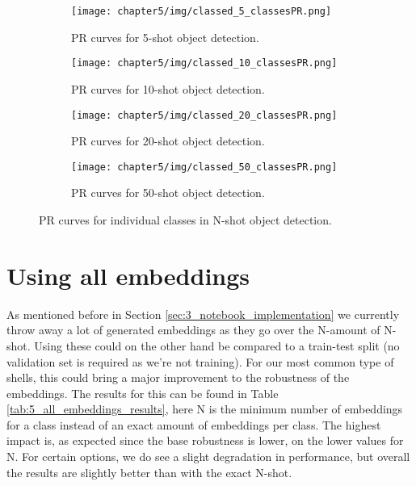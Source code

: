 \begin{figure}[H]
    \centering
    \begin{adjustwidth}{-0.5in}{-0.5in}
        \begin{subfigure}[b]{0.4\pdfpagewidth}
            \texttt{[image: chapter5/img/classed\_5\_classesPR.png]}
            \caption{PR curves for 5-shot object detection.}
            \label{fig:5_5_shot_classed_classes_PR}
        \end{subfigure}
        \hfill
        \begin{subfigure}[b]{0.4\pdfpagewidth}
            \texttt{[image: chapter5/img/classed\_10\_classesPR.png]}
            \caption{PR curves for 10-shot object detection.}
            \label{fig:5_10_shot_classed_classes_PR}
        \end{subfigure}
        \begin{subfigure}[b]{0.4\pdfpagewidth}
            \texttt{[image: chapter5/img/classed\_20\_classesPR.png]}
            \caption{PR curves for 20-shot object detection.}
            \label{fig:5_20_shot_classed_classes_PR}
        \end{subfigure}
        \hfill
        \begin{subfigure}[b]{0.4\pdfpagewidth}
            \texttt{[image: chapter5/img/classed\_50\_classesPR.png]}
            \caption{PR curves for 50-shot object detection.}
            \label{fig:5_50_shot_classed_classes_PR}
        \end{subfigure}
        \caption{PR curves for individual classes in N-shot object detection.}
        \label{fig:5_n_shot_classed_classes_PR}
    \end{adjustwidth}
\end{figure}

\section{Using all embeddings}
As mentioned before in Section \ref{sec:3_notebook_implementation} we currently throw away a lot of generated embeddings as they go over the N-amount of N-shot. Using these could on the other hand be compared to a train-test split (no validation set is required as we're not training). For our most common type of shells, this could bring a major improvement to the robustness of the embeddings. The results for this can be found in Table \ref{tab:5_all_embeddings_results}, here N is the minimum number of embeddings for a class instead of an exact amount of embeddings per class. The highest impact is, as expected since the base robustness is lower, on the lower values for N. For certain options, we do see a slight degradation in performance, but overall the results are slightly better than with the exact N-shot.

